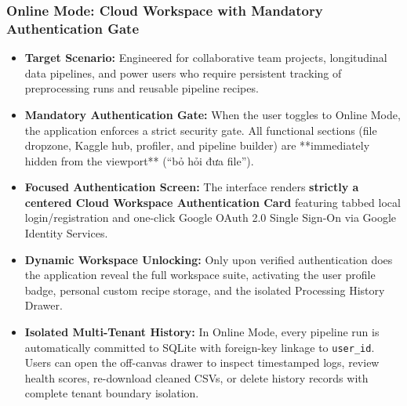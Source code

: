 \subsubsection{Online Mode: Cloud Workspace with Mandatory Authentication Gate}
\begin{itemize}
  \item \textbf{Target Scenario:} Engineered for collaborative team projects, longitudinal data pipelines, and power users who require persistent tracking of preprocessing runs and reusable pipeline recipes.
  \item \textbf{Mandatory Authentication Gate:} When the user toggles to Online Mode, the application enforces a strict security gate. All functional sections (file dropzone, Kaggle hub, profiler, and pipeline builder) are **immediately hidden from the viewport** (``bỏ hỏi đưa file'').
  \item \textbf{Focused Authentication Screen:} The interface renders \textbf{strictly a centered Cloud Workspace Authentication Card} featuring tabbed local login/registration and one-click Google OAuth 2.0 Single Sign-On via Google Identity Services.
  \item \textbf{Dynamic Workspace Unlocking:} Only upon verified authentication does the application reveal the full workspace suite, activating the user profile badge, personal custom recipe storage, and the isolated Processing History Drawer.
  \item \textbf{Isolated Multi-Tenant History:} In Online Mode, every pipeline run is automatically committed to SQLite with foreign-key linkage to \texttt{user\_id}. Users can open the off-canvas drawer to inspect timestamped logs, review health scores, re-download cleaned CSVs, or delete history records with complete tenant boundary isolation.
\end{itemize}

